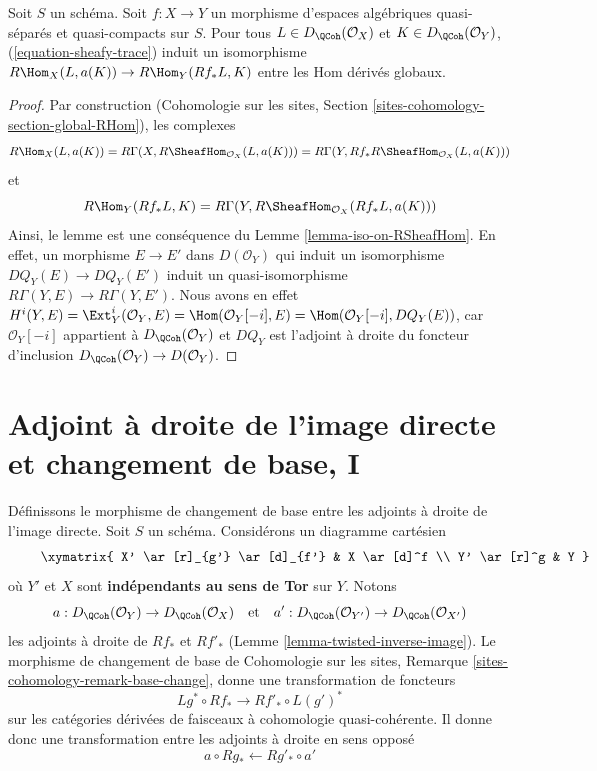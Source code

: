 \begin{lemma}
\label{lemma-iso-global-hom}
Soit $S$ un schéma.
Soit $f : X \to Y$ un morphisme d'espaces algébriques quasi-séparés et quasi-compacts
sur $S$.
Pour tous $L \in D_\QCoh(\mathcal{O}_X)$ et $K \in D_\QCoh(\mathcal{O}_Y)$,
(\ref{equation-sheafy-trace}) induit un isomorphisme
$R\Hom_X(L, a(K)) \to R\Hom_Y(Rf_*L, K)$ entre les Hom dérivés globaux.
\end{lemma}

\begin{proof}
Par construction (Cohomologie sur les sites, Section
\ref{sites-cohomology-section-global-RHom}), les complexes
$$
R\Hom_X(L, a(K)) =
R\Gamma(X, R\SheafHom_{\mathcal{O}_X}(L, a(K))) =
R\Gamma(Y, Rf_*R\SheafHom_{\mathcal{O}_X}(L, a(K)))
$$
et
$$
R\Hom_Y(Rf_*L, K) = R\Gamma(Y, R\SheafHom_{\mathcal{O}_X}(Rf_*L, a(K)))
$$
Ainsi, le lemme est une conséquence du Lemme \ref{lemma-iso-on-RSheafHom}.
En effet, un morphisme $E \to E'$ dans $D(\mathcal{O}_Y)$ qui induit
un isomorphisme $DQ_Y(E) \to DQ_Y(E')$ induit un quasi-isomorphisme
$R\Gamma(Y, E) \to R\Gamma(Y, E')$. Nous avons en effet
$H^i(Y, E) = \Ext^i_Y(\mathcal{O}_Y, E) = \Hom(\mathcal{O}_Y[-i], E) =
\Hom(\mathcal{O}_Y[-i], DQ_Y(E))$, car $\mathcal{O}_Y[-i]$
appartient à $D_\QCoh(\mathcal{O}_Y)$ et $DQ_Y$ est l'adjoint à droite
du foncteur d'inclusion $D_\QCoh(\mathcal{O}_Y) \to D(\mathcal{O}_Y)$.
\end{proof}







 
\section{Adjoint à droite de l'image directe et changement de base, I}
\label{section-base-change-map}

\noindent
Définissons le morphisme de changement de base entre les adjoints à droite de l'image directe.
Soit $S$ un schéma. Considérons un diagramme cartésien
\begin{equation}
\label{equation-base-change}
\vcenter{
\xymatrix{
X' \ar[r]_{g'} \ar[d]_{f'} & X \ar[d]^f \\
Y' \ar[r]^g & Y
}
}
\end{equation}
où $Y'$ et $X$ sont {\bf indépendants au sens de Tor} sur $Y$. Notons
$$
a  : D_\QCoh(\mathcal{O}_Y) \to D_\QCoh(\mathcal{O}_X)
\quad\text{et}\quad
a' : D_\QCoh(\mathcal{O}_{Y'}) \to D_\QCoh(\mathcal{O}_{X'})
$$
les adjoints à droite de $Rf_*$ et $Rf'_*$
(Lemme \ref{lemma-twisted-inverse-image}).
Le morphisme de changement de base de
Cohomologie sur les sites, Remarque \ref{sites-cohomology-remark-base-change},
donne une transformation de foncteurs
$$
Lg^* \circ Rf_* \longrightarrow Rf'_* \circ L(g')^*
$$
sur les catégories dérivées de faisceaux à cohomologie quasi-cohérente.
Il donne donc une transformation entre les adjoints à droite en sens opposé
$$
a \circ Rg_* \longleftarrow Rg'_* \circ a'
$$

